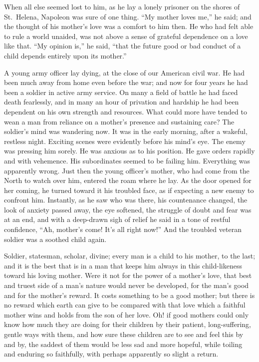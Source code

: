 \documentclass[
]{book}
\begin{document}
When all else seemed lost to him, as he lay a lonely prisoner on the shores of St.~Helena, Napoleon was sure of one thing. ``My mother loves me,'' he said; and the thought of his mother's love was a comfort to him then. He who had felt able to rule a world unaided, was not above a sense of grateful dependence on a love like that. ``My opinion is,'' he said, ``that the future good or bad conduct of a child depends entirely upon its mother.''

A young army officer lay dying, at the close of our American civil war. He had been much away from home even before the war; and now for four years he had been a soldier in active army service. On many a field of battle he had faced death fearlessly, and in many an hour of privation and hardship he had been dependent on his own strength and resources. What could more have tended to wean a man from reliance on a mother's presence and sustaining care? The soldier's mind was wandering now. It was in the early morning, after a wakeful, restless night. Exciting scenes were evidently before his mind's eye. The enemy was pressing him sorely. He was anxious as to his position. He gave orders rapidly and with vehemence. His subordinates seemed to be failing him. Everything was apparently wrong. Just then the young officer's mother, who had come from the North to watch over him, entered the roam where he lay. As the door opened for her coming, he turned toward it his troubled face, as if expecting a new enemy to confront him. Instantly, as he saw who was there, his countenance changed, the look of anxiety passed away, the eye softened, the struggle of doubt and fear was at an end, and with a deep-drawn sigh of relief he said in a tone of restful confidence, ``Ah, mother's come! It's all right now!'' And the troubled veteran soldier was a soothed child again.

Soldier, statesman, scholar, divine; every man is a child to his mother, to the last; and it is the best that is in a man that keeps him always in this child-likeness toward his loving mother. Were it not for the power of a mother's love, that best and truest side of a man's nature would never be developed, for the man's good and for the mother's reward. It costs something to be a good mother; but there is no reward which earth can give to be compared with that love which a faithful mother wins and holds from the son of her love. Oh! if good mothers could only know how much they are doing for their children by their patient, long-suffering, gentle ways with them, and how sure these children are to see and feel this by and by, the saddest of them would be less sad and more hopeful, while toiling and enduring so faithfully, with perhaps apparently so slight a return.
\end{document}
